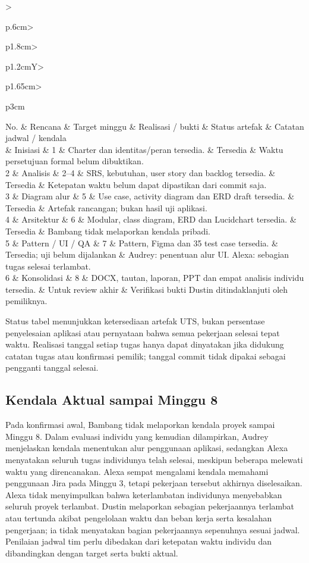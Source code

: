 \documentclass[11pt,a4paper]{article}
\newcommand{\tbl}[2]{\par\smallskip\noindent\begin{tabularx}{\linewidth}{#1}\toprule #2\bottomrule\end{tabularx}\par\smallskip}
\begin{document}
\begingroup
\small
\setlength{\tabcolsep}{3pt}
\tbl{>{\raggedright\arraybackslash}p{.6cm}>{\raggedright\arraybackslash}p{1.8cm}>{\raggedright\arraybackslash}p{1.2cm}Y>{\raggedright\arraybackslash}p{1.65cm}>{\raggedright\arraybackslash}p{3cm}}{No. & Rencana & Target minggu & Realisasi / bukti & Status artefak & Catatan jadwal / kendala\\\midrule
1 & Inisiasi & 1 & Charter dan identitas/peran tersedia. & Tersedia & Waktu persetujuan formal belum dibuktikan.\\
2 & Analisis & 2--4 & SRS, kebutuhan, user story dan backlog tersedia. & Tersedia & Ketepatan waktu belum dapat dipastikan dari commit saja.\\
3 & Diagram alur & 5 & Use case, activity diagram dan ERD draft tersedia. & Tersedia & Artefak rancangan; bukan hasil uji aplikasi.\\
4 & Arsitektur & 6 & Modular, class diagram, ERD dan Lucidchart tersedia. & Tersedia & Bambang tidak melaporkan kendala pribadi.\\
5 & Pattern / UI / QA & 7 & Pattern, Figma dan 35 test case tersedia. & Tersedia; uji belum dijalankan & Audrey: penentuan alur UI. Alexa: sebagian tugas selesai terlambat.\\
6 & Konsolidasi & 8 & DOCX, tautan, laporan, PPT dan empat analisis individu tersedia. & Untuk review akhir & Verifikasi bukti Dustin ditindaklanjuti oleh pemiliknya.\\
}
\endgroup
Status tabel menunjukkan ketersediaan artefak UTS, bukan persentase penyelesaian aplikasi atau pernyataan bahwa semua pekerjaan selesai tepat waktu. Realisasi tanggal setiap tugas hanya dapat dinyatakan jika didukung catatan tugas atau konfirmasi pemilik; tanggal commit tidak dipakai sebagai pengganti tanggal selesai.
\subsection{Kendala Aktual sampai Minggu 8}
Pada konfirmasi awal, Bambang tidak melaporkan kendala proyek sampai Minggu 8. Dalam evaluasi individu yang kemudian dilampirkan, Audrey menjelaskan kendala menentukan alur penggunaan aplikasi, sedangkan Alexa menyatakan seluruh tugas individunya telah selesai, meskipun beberapa melewati waktu yang direncanakan. Alexa sempat mengalami kendala memahami penggunaan Jira pada Minggu 3, tetapi pekerjaan tersebut akhirnya diselesaikan. Alexa tidak menyimpulkan bahwa keterlambatan individunya menyebabkan seluruh proyek terlambat. Dustin melaporkan sebagian pekerjaannya terlambat atau tertunda akibat pengelolaan waktu dan beban kerja serta kesalahan pengerjaan; ia tidak menyatakan bagian pekerjaannya sepenuhnya sesuai jadwal. Penilaian jadwal tim perlu dibedakan dari ketepatan waktu individu dan dibandingkan dengan target serta bukti aktual. \cite{audreyind,dustinind,alexaind}
\end{document}

